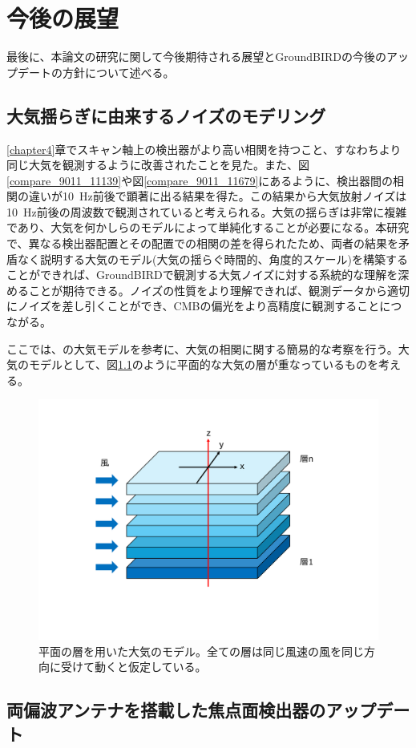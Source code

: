 \chapter{今後の展望}
\label{chapter5}
最後に、本論文の研究に関して今後期待される展望とGroundBIRDの今後のアップデートの方針について述べる。
\section{大気揺らぎに由来するノイズのモデリング}
\label{atmos_model}
\ref{chapter4}章でスキャン軸上の検出器がより高い相関を持つこと、すなわちより同じ大気を観測するように改善されたことを見た。また、図\ref{compare_9011_11139}や図\ref{compare_9011_11679}にあるように、検出器間の相関の違いが\SI{10}{Hz}前後で顕著に出る結果を得た。この結果から大気放射ノイズは\SI{10}{Hz}前後の周波数で観測されていると考えられる。大気の揺らぎは非常に複雑であり、大気を何かしらのモデルによって単純化することが必要になる。本研究で、異なる検出器配置とその配置での相関の差を得られたため、両者の結果を矛盾なく説明する大気のモデル(大気の揺らぐ時間的、角度的スケール)を構築することができれば、GroundBIRDで観測する大気ノイズに対する系統的な理解を深めることが期待できる。ノイズの性質をより理解できれば、観測データから適切にノイズを差し引くことができ、CMBの偏光をより高精度に観測することにつながる。

ここでは、\cite{nishinomiya}の大気モデルを参考に、大気の相関に関する簡易的な考察を行う。大気のモデルとして、図\ref{atmos_layer}のように平面的な大気の層が重なっているものを考える。

\begin{figure}[htbp]
  \centering
  \includegraphics[width=0.7\columnwidth]{6_prospect/figs/atmos_layer.pdf}
  \caption{平面の層を用いた大気のモデル。全ての層は同じ風速の風を同じ方向に受けて動くと仮定している。}
  \label{atmos_layer}
\end{figure}
\section{両偏波アンテナを搭載した焦点面検出器のアップデート}
